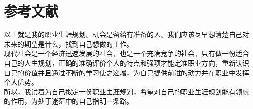 \section*{参考文献}
\note
{	以上就是我的职业生涯规划。机会是留给有准备的人。我们应该尽早想清楚自己对未来的期望是什么，找到自己想做的工作。
	\\现代社会是一个经济迅速发展的社会，也是一个充满竞争的社会，只有做一份适合自己的人生规划，正确的准确评价个人的特点和强项才能定准职业方向，重新认识自己的价值并且通过不断的学习使之递增，为自己提供前进的动力并在职业中发挥个人优势。
	\\所以，我试着为自己拟定一份职业生涯规划，希望对自己的职业生涯规划能有领航的作用，为处于迷茫中的自己指明一条路。
}
